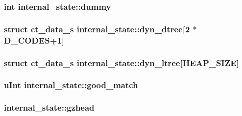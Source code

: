 \subsubsection[{dummy}]{\setlength{\rightskip}{0pt plus 5cm}int internal\+\_\+state\+::dummy}\label{structinternal__state_ab000a3e3c901dd063859521988ad7e52}
\hypertarget{structinternal__state_a42a52476d3cde41e57a6ef2a6a78008f}{}
\subsubsection[{dyn\+\_\+dtree}]{\setlength{\rightskip}{0pt plus 5cm}struct {\bf ct\+\_\+data\+\_\+s} internal\+\_\+state\+::dyn\+\_\+dtree\mbox{[}2 $\ast${\bf D\+\_\+\+C\+O\+D\+E\+S}+1\mbox{]}}\label{structinternal__state_a42a52476d3cde41e57a6ef2a6a78008f}
\hypertarget{structinternal__state_ae11867c05d54c575dbc713bbea71266c}{}
\subsubsection[{dyn\+\_\+ltree}]{\setlength{\rightskip}{0pt plus 5cm}struct {\bf ct\+\_\+data\+\_\+s} internal\+\_\+state\+::dyn\+\_\+ltree\mbox{[}{\bf H\+E\+A\+P\+\_\+\+S\+I\+Z\+E}\mbox{]}}\label{structinternal__state_ae11867c05d54c575dbc713bbea71266c}
\hypertarget{structinternal__state_a68ba00254242017f330dca5e0191bca4}{}
\subsubsection[{good\+\_\+match}]{\setlength{\rightskip}{0pt plus 5cm}u\+Int internal\+\_\+state\+::good\+\_\+match}\label{structinternal__state_a68ba00254242017f330dca5e0191bca4}
\hypertarget{structinternal__state_ac023d0c9e6112dfe6cbd049a56484997}{}
\subsubsection[{gzhead}]{ internal\+\_\+state\+::gzhead}\label{structinternal__state_ac023d0c9e6112dfe6cbd049a56484997}
\hypertarget{structinternal__state_a5e09188a83aadfcb0db60b0765596aa1}{}
